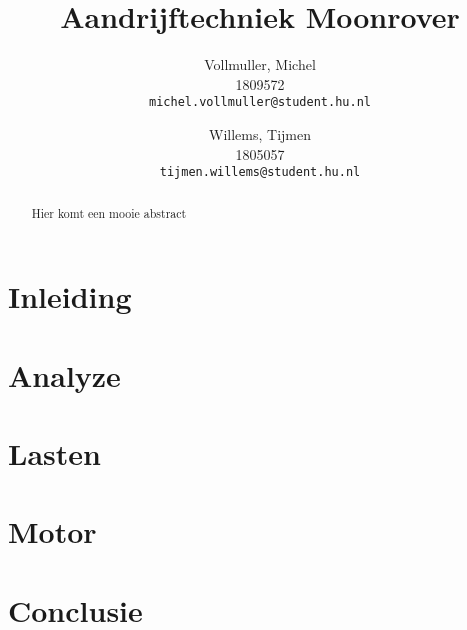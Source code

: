 \documentclass{article}
\title{Aandrijftechniek Moonrover}
\author{
  Vollmuller, Michel\\
  1809572\\
  \texttt{michel.vollmuller@student.hu.nl}
  \and
  Willems, Tijmen\\
  1805057\\
  \texttt{tijmen.willems@student.hu.nl}
}
\begin{document}
\maketitle

\begin{abstract}
    Hier komt een mooie abstract
\end{abstract}

\newpage

\section{Inleiding}


\section{Analyze} 


\newpage

\section{Lasten}


\newpage

\section{Motor}


\newpage

\section*{Conclusie}


% 
% 

% 
% 
\end{document}

